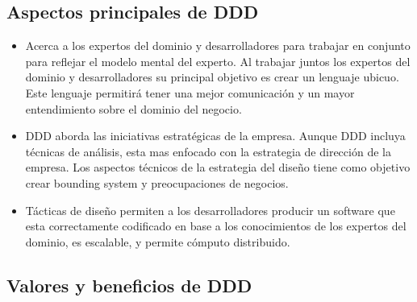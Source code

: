 \documentclass[12pt,twoside]{reedthesis}
\theoremstyle{definition}
\theoremstyle{definition}
\theoremstyle{definition}
\theoremstyle{remark}
\begin{document}
\hypertarget{aspectos-principales-de-ddd}{%
\subsection{Aspectos principales de
DDD}\label{aspectos-principales-de-ddd}}
\begin{itemize}
\item
  Acerca a los expertos del dominio y desarrolladores para trabajar en
  conjunto para reflejar el modelo mental del experto. Al trabajar
  juntos los expertos del dominio y desarrolladores su principal
  objetivo es crear un lenguaje ubicuo. Este lenguaje permitirá tener
  una mejor comunicación y un mayor entendimiento sobre el dominio del
  negocio.
\item
  DDD aborda las iniciativas estratégicas de la empresa. Aunque DDD
  incluya técnicas de análisis, esta mas enfocado con la estrategia de
  dirección de la empresa. Los aspectos técnicos de la estrategia del
  diseño tiene como objetivo crear bounding system y preocupaciones de
  negocios.
\item
  Tácticas de diseño permiten a los desarrolladores producir un software
  que esta correctamente codificado en base a los conocimientos de los
  expertos del dominio, es escalable, y permite cómputo distribuido.
\end{itemize}
\hypertarget{valores-y-beneficios-de-ddd}{%
\subsection{Valores y beneficios de
DDD}\label{valores-y-beneficios-de-ddd}}
\end{document}
